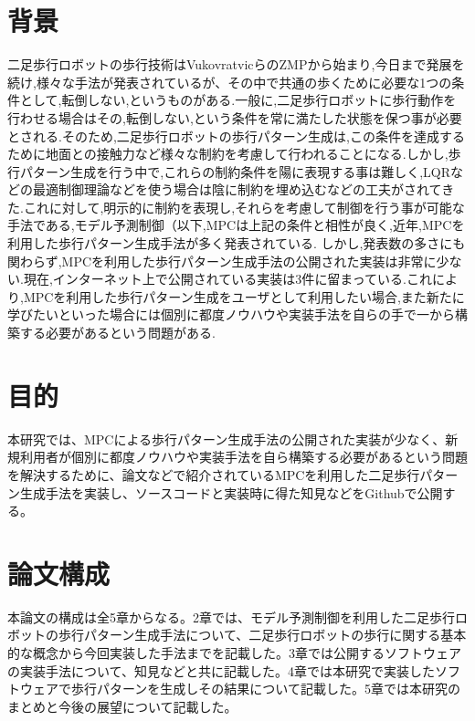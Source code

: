 
\section{背景}
二足歩行ロボットの歩行技術はVukovratvicらのZMP\cite{VUKOBRATOVIC19721}から始まり,今日まで発展を続け,様々な手法が発表されているが、その中で共通の歩くために必要な1つの条件として,転倒しない,というものがある.一般に,二足歩行ロボットに歩行動作を行わせる場合はその,転倒しない,という条件を常に満たした状態を保つ事が必要とされる.そのため,二足歩行ロボットの歩行パターン生成は,この条件を達成するために地面との接触力など様々な制約を考慮して行われることになる.しかし,歩行パターン生成を行う中で,これらの制約条件を陽に表現する事は難しく,LQRなどの最適制御理論などを使う場合は陰に制約を埋め込むなどの工夫がされてきた.これに対して,明示的に制約を表現し,それらを考慮して制御を行う事が可能な手法である,モデル予測制御（以下,MPC\cite{MPC}は上記の条件と相性が良く,近年,MPCを利用した歩行パターン生成手法が多く発表されている.
しかし,発表数の多さにも関わらず,MPCを利用した歩行パターン生成手法の公開された実装は非常に少ない.現在,インターネット上で公開されている実装は3件\cite{GITHUB1}\cite{GITHUB2}\cite{GITHUB3}に留まっている.これにより,MPCを利用した歩行パターン生成をユーザとして利用したい場合,また新たに学びたいといった場合には個別に都度ノウハウや実装手法を自らの手で一から構築する必要があるという問題がある.

\section{目的}
本研究では、MPCによる歩行パターン生成手法の公開された実装が少なく、新規利用者が個別に都度ノウハウや実装手法を自ら構築する必要があるという問題を解決するために、論文などで紹介されているMPCを利用した二足歩行パターン生成手法を実装し、ソースコードと実装時に得た知見などをGithub\cite{MYGITHUB}で公開する。

\section{論文構成}
本論文の構成は全5章からなる。2章では、モデル予測制御を利用した二足歩行ロボットの歩行パターン生成手法について、二足歩行ロボットの歩行に関する基本的な概念から今回実装した手法までを記載した。3章では公開するソフトウェアの実装手法について、知見などと共に記載した。4章では本研究で実装したソフトウェアで歩行パターンを生成しその結果について記載した。5章では本研究のまとめと今後の展望について記載した。


\newpage
